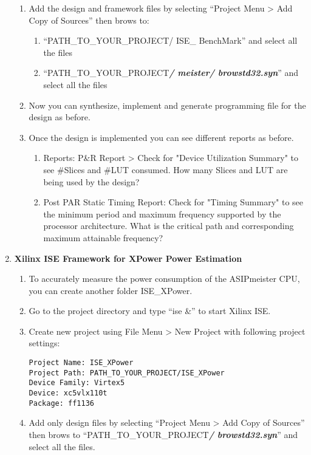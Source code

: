 \begin{enumerate}
\begin{enumerate}
	\item
	Add the design and framework files by selecting ``Project Menu
	\textgreater{} Add Copy of Sources'' then brows to:
	\begin{enumerate}
		\item
		``PATH\_TO\_YOUR\_PROJECT/ ISE\_ BenchMark'' and select all the
		files
		\item
		``PATH\_TO\_YOUR\_PROJECT\emph{\textbf{/ meister/ browstd32.syn}}''
		and select all the files
	\end{enumerate}
	\item
	Now you can synthesize, implement and generate programming file for
	the design as before.
	\item
	Once the design is implemented you can see different reports as
	before.
	\begin{enumerate}[label=(\alph*),start=3]
	\color{red}\item\normalcolor
	Reports: P\&R Report \textgreater{} Check for "Device Utilization
	Summary" to see \#Slices and \#LUT consumed. How many Slices and LUT are being used by the design?
	\color{red}\item\normalcolor
	Post PAR Static Timing Report: Check for "Timing Summary" to see the
	minimum period and maximum frequency supported by the processor
	architecture. What is the critical path and corresponding maximum attainable frequency?
	\end{enumerate}
\end{enumerate}
\item \textbf{Xilinx ISE Framework for XPower Power Estimation}
	\begin{enumerate}
		\item
		To accurately measure the power consumption of the ASIPmeister CPU,
		you can create another folder ISE\_XPower.
		\item
		Go to the project directory and type ``ise \&'' to start Xilinx ISE.
		\item
		Create new project using File Menu \textgreater{} New Project with
		following project settings:
	\begin{lstlisting}
Project Name: ISE_XPower
Project Path: PATH_TO_YOUR_PROJECT/ISE_XPower
Device Family: Virtex5
Device: xc5vlx110t
Package: ff1136
	\end{lstlisting}
	\item
	Add only design files by selecting ``Project Menu \textgreater{} Add
	Copy of Sources'' then brows to
	``PATH\_TO\_YOUR\_PROJECT\emph{\textbf{/ browstd32.syn}}'' and select
	all the files.

\end{enumerate}
\end{enumerate}

